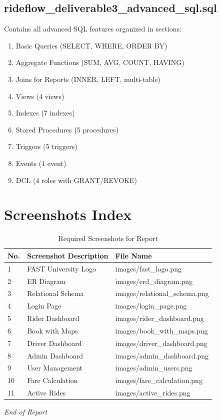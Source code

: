 \documentclass[12pt,a4paper]{report}
\begin{document}
\section{rideflow\_deliverable3\_advanced\_sql.sql}
Contains all advanced SQL features organized in sections:
\begin{enumerate}
    \item Basic Queries (SELECT, WHERE, ORDER BY)
    \item Aggregate Functions (SUM, AVG, COUNT, HAVING)
    \item Joins for Reports (INNER, LEFT, multi-table)
    \item Views (4 views)
    \item Indexes (7 indexes)
    \item Stored Procedures (5 procedures)
    \item Triggers (5 triggers)
    \item Events (1 event)
    \item DCL (4 roles with GRANT/REVOKE)
\end{enumerate}

\chapter{Screenshots Index}

\begin{table}[H]
\centering
\caption{Required Screenshots for Report}
\begin{tabular}{|p{1cm}|p{6cm}|p{6cm}|}
\hline
\textbf{No.} & \textbf{Screenshot Description} & \textbf{File Name} \\
\hline
1 & FAST University Logo & images/fast\_logo.png \\
\hline
2 & ER Diagram & images/erd\_diagram.png \\
\hline
3 & Relational Schema & images/relational\_schema.png \\
\hline
4 & Login Page & images/login\_page.png \\
\hline
5 & Rider Dashboard & images/rider\_dashboard.png \\
\hline
6 & Book with Maps & images/book\_with\_maps.png \\
\hline
7 & Driver Dashboard & images/driver\_dashboard.png \\
\hline
8 & Admin Dashboard & images/admin\_dashboard.png \\
\hline
9 & User Management & images/admin\_users.png \\
\hline
10 & Fare Calculation & images/fare\_calculation.png \\
\hline
11 & Active Rides & images/active\_rides.png \\
\hline
\end{tabular}
\end{table}

\vspace{1cm}
\begin{center}
\textit{End of Report}
\end{center}
\end{document}
